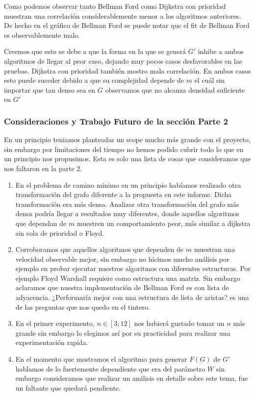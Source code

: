 \documentclass[12pt]{article}
\begin{document}
Como podemos observar tanto Bellman Ford como Dijkstra con prioridad muestran una correlación considerablemente menor a los algoritmos anteriores. De hecho en el gráfico de Bellman Ford se puede notar que el fit de Bellman Ford es observablemente malo.

Creemos que esto se debe a que la forma en la que se generá $G'$ inhibe a ambos algoritmos de llegar al peor caso, dejando muy pocos casos desfavorables en las pruebas. Dijkstra con prioridad también mostro mala correlación. En ambos casos esto puede suceder debido a que su complejidad depende de $m$ el cuál sin importar que tan denso sea en $G$ observamos que no alcanza densidad suficiente en $G'$


\subsubsection{Consideraciones y Trabajo Futuro de la sección Parte 2}

En un principio teniamos planteadas un scope mucho más grande con el proyecto, sin embargo por limitaciones del tiempo no hemos podido cubrir todo lo que en un principio nos propusimos. Esta es solo una lista de cosas que consideramos que nos faltaron en la parte 2.

\begin{enumerate}
	\item En el problema de camino minimo en un principio habíamos realizado otra transformación del grafo diferente a la propuesta en este informe. Dicha transformación era más densa. Analizar otra transformación del grafo más densa podría llegar a resultados muy diferentes, donde aquellos algoritmos que dependan de $m$ muestren un comportamiento peor, más similar a dijkstra sin cola de prioridad o Floyd.
	
	\item Corroboramos que aquellos algoritmos que dependen de $m$ muestran una velocidad observable mejor, sin embargo no hicimos mucho análisis por ejemplo en probar ejecutar nuestros algoritmos con diferentes estructuras. Por ejemplo Floyd Warshall requiere como estructura una matriz. Sin embargo aclaramos que nuestra implementación de Bellman Ford es con lista de adyacencia. ¿Performaría mejor con una estructura de lista de aristas? es una de las preguntas que nos quedo en el tintero.
	
	\item En el primer experimento, $n \in [3; 12]$ nos hubierá gustado tomar un $n$ más grande sin embargo lo elegimos así por su practicidad para realizar una experimentación rapida.
	
	\item En el momento que mostramos el algoritmo para generar $F(G)$ de $G'$ hablamos de lo fuertemente dependiente que era del parámetro $W$ sin embargo consideramos que realizar un análisis en detalle sobre este tema, fue un faltante que quedará pendiente.
\end{enumerate}
\end{document}
